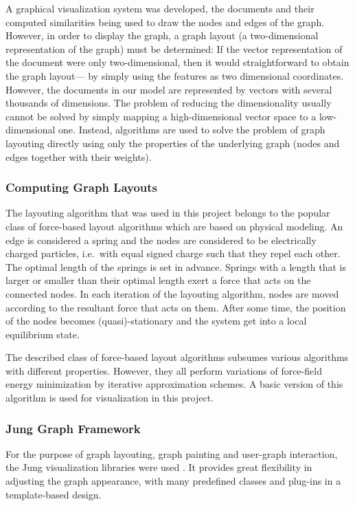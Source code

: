 A graphical visualization system was developed, the documents and their computed similarities being used to draw the nodes and edges of the graph.
However, in order to display the graph, a graph layout (a two-dimensional representation of the
graph) must be determined: If the vector representation of the document were only two-dimensional,
then it would straightforward to obtain the graph layout--- by simply using the features as two dimensional
coordinates. However, the documents in our model are represented by vectors with several thousands
of dimensions. The problem of reducing the dimensionality usually cannot be solved by simply mapping a high-dimensional vector space to a low-dimensional one. Instead, algorithms are used to solve the problem of graph layouting directly using only the properties of the underlying graph
(nodes and edges together with their weights).

\subsubsection{Computing Graph Layouts}
The layouting algorithm that was used in this project belongs to the popular class of force-based
layout algorithms which are based on physical modeling. An edge is considered a spring and
the nodes are considered to be electrically charged particles, i.e.\ with equal signed charge such
that they repel each other. The optimal length of the springs is set in advance. Springs with a 
length that is larger or smaller than their optimal length exert a force that acts on the connected
nodes. In each iteration of the layouting algorithm, nodes are moved according to the resultant
force
that acts on them. After some time, the position of the nodes becomes (quasi)-stationary and the
system get into a local equilibrium state.

The described class of force-based layout algorithms subsumes various algorithms with different
properties. However, they all perform variations of force-field energy minimization by iterative
approximation schemes. A basic version of this algorithm is used for visualization in this project.

\subsubsection{Jung Graph Framework}
For the purpose of graph layouting, graph painting and user-graph interaction, the
Jung visualization libraries were used \cite{jung}. It provides great
flexibility in adjusting the graph appearance, with many predefined classes and plug-ins in a template-based design.

